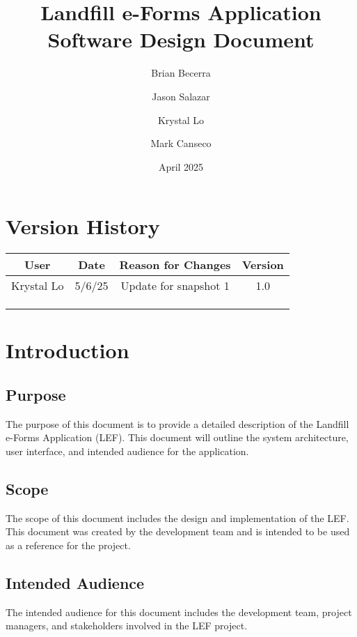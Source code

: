 \documentclass[12pt]{article}
\title{Landfill e-Forms Application\\
Software Design Document}
\author{
    Brian Becerra\\
    \and
    Jason Salazar\\
    \and
    Krystal Lo\\
    \and
    Mark Canseco\\
    }
\date{April 2025}
\begin{document}
\begin{titlepage}
\maketitle
\thispagestyle{empty}
\end{titlepage}

\thispagestyle{empty}
\tableofcontents
\newpage

\section*{Version History}
\begin{table}[ht]
    \centering
    \begin{tabular}{|c|c|c|c|}
    \hline
    \textbf{User} & \textbf{Date} & \textbf{Reason for Changes} & \textbf{Version}\\
    \hline
         Krystal Lo &  5/6/25 &  Update for snapshot 1 & 1.0 \\
    \hline
         &  &  & \\
    \hline
         &  &  & \\
    \hline
         &  &  & \\
    \hline
    \end{tabular}
\end{table}
\newpage

\section{Introduction}
\subsection{Purpose}
The purpose of this document is to provide a detailed description of the Landfill e-Forms Application (LEF). This document will outline the system architecture, user interface, and intended audience for the application.
\subsection{Scope}
The scope of this document includes the design and implementation of the LEF. This document was created by the development team and is intended to be used as a reference for the project.
\subsection{Intended Audience}
The intended audience for this document includes the development team, project managers, and stakeholders involved in the LEF project. 
\end{document}
